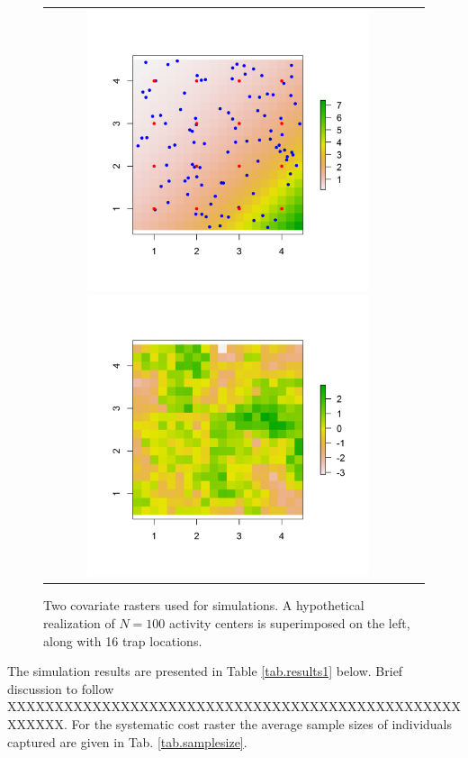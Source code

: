 \documentclass[12pt]{article}
\begin{document}
\begin{figure}
\begin{tabular}{cc}
\includegraphics[height=3.25in,width=3.25in]{figs/raster_withN100}
\includegraphics[height=3.25in,width=3.25in]{figs/raster_krige} &
\end{tabular}
\caption{Two covariate rasters used for simulations. A hypothetical
  realization of $N=100$ activity centers is superimposed on the left,
along with 16 trap locations. }
\label{ecoldist.fig.raster100}
\end{figure}

The simulation results are presented in Table \ref{tab.results1} below. Brief
discussion to follow XXXXXXXXXXXXXXXXXXXXXXXXXXXXXXXXXXXXXXXXXXXXXXXXXXXXXX. 
For the systematic cost raster the average sample sizes of individuals
captured are given in Tab. \ref{tab.samplesize}.

\end{document}
